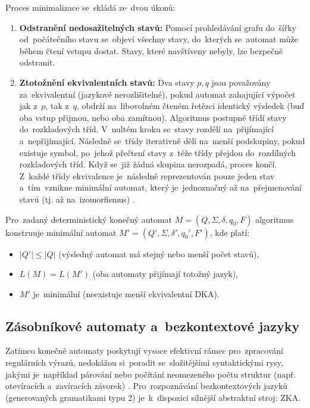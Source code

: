 \documentclass[
  master,
  program=ainfvs,
  printversion,
  figures=false,
  tables=false,
  glossaries,
  index
]{kidiplom}
\begin{document}
Proces minimalizace se~skládá ze~dvou úkonů:
\begin{enumerate}
    \item \textbf{Odstranění nedosažitelných stavů:} Pomocí prohledávání grafu do~šířky od~počátečního stavu se~objeví všechny stavy, do~kterých se~automat může během čtení vstupu dostat. Stavy, které navštíveny nebyly, lze bezpečně odstranit.
    \item \textbf{Ztotožnění ekvivalentních stavů:} Dva stavy $p, q$ jsou považovány za~ek\-vi\-va\-lentní (jazykově nerozlišitelné), pokud automat zahajující výpočet jak z~$p$, tak z~$q$, obdrží na~libovolném čteném řetězci identický výsledek (buď oba vstup přijmou, nebo oba zamítnou). Algoritmus postupně třídí stavy do~rozkladových tříd. V~nultém kroku se~stavy rozdělí na~přijímající a~nepřijímající. Následně se~třídy iterativně dělí na~menší podskupiny, pokud existuje symbol, po~jehož přečtení stavy z~téže třídy přejdou do~rozdílných rozkladových tříd. Když se~již žádná skupina nerozpadá, proces končí. Z~každé třídy ekvivalence je~následně reprezentován pouze jeden stav a~tím~vznikne minimální automat, který je~jednoznačný až na~přejmenování stavů (tj. až na~izomorfismus) \cite[kapitola~3.6]{jancar_ti} \cite[kapitola~9]{balun_fj}.
\end{enumerate}

Pro~zadaný deterministický konečný automat $M = (Q, \Sigma, \delta, q_0, F)$ algoritmus konstruuje minimální automat $M' = (Q', \Sigma, \delta', q_0', F')$, kde platí:
\begin{itemize}
    \item $|Q'| \leq |Q|$ (výsledný automat má stejný nebo menší počet stavů),
    \item $L(M) = L(M')$ (oba automaty přijímají totožný jazyk),
    \item $M'$ je~minimální (neexistuje menší ekvivalentní \gls{DKA}).
\end{itemize}

\subsection{Zásobníkové automaty a~bezkontextové jazyky}
Zatímco konečné automaty poskytují vysoce efektivní rámec pro~zpracování regulárních
výrazů, nedokážou si~poradit se~složitějšími syntaktickými rysy, jakými je~například
párování nebo počítání neomezeného počtu struktur (např. otevíracích a~zavíracích
závorek) \cite[kapitola~4]{jancar_ti}. Pro~rozpoznávání bezkontextových jazyků
(generovaných gramatikami typu 2) je~k~dispozici silnější abstraktní stroj: \gls{ZKA}.
\end{document}
